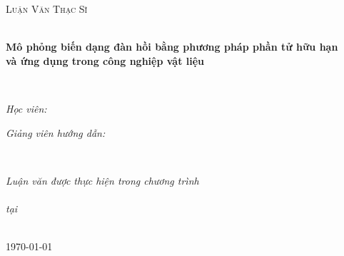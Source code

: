 \documentclass[
12pt, %
oneside, %
english, %
onehalfspacing, %
nolistspacing, %
headsepline, %
addchap,
]{MastersDoctoralThesis} %
\author{Nguyễn Lê \textsc{Hoàng}} %
\begin{document}
\dominitoc
\frontmatter %

\pagestyle{plain} %


\begin{titlepage}
\begin{center}

\vspace*{.04\textheight}
{\scshape\LARGE \univname\par}\vspace{1.35cm} %
\textsc{\Large Luận Văn Thạc Sĩ}\\[0.2cm] %

\HRule \\[-0.1cm] %
{\huge \bfseries Mô phỏng biến dạng đàn hồi bằng phương pháp phần tử hữu hạn\\và ứng dụng trong công nghiệp vật liệu \par}\vspace{0.1cm} %
\HRule \\[1cm] %
 
\begin{minipage}[t]{0.4\textwidth}
\begin{flushleft} \large
\emph{Học viên:}\\
\href{hoangnl.w@gmail.com}{\authorname} %
\end{flushleft}
\end{minipage}
\begin{minipage}[t]{0.4\textwidth}
\begin{flushright} \large
\emph{Giảng viên hướng dẫn:} \\
\href{mai.tathithanh@hust.edu.vn}{\supname} %
\end{flushright}
\end{minipage}\\[1.5cm] 
\vfill

\large \textit{Luận văn được thực hiện trong chương trình \\\degreename}\\ %
\textit{tại}\\
\facname \\[1cm] %
 
\vfill

{\large \today}\\[3.5cm] %
 
\vfill
\end{center}
\end{titlepage}
\end{document}
